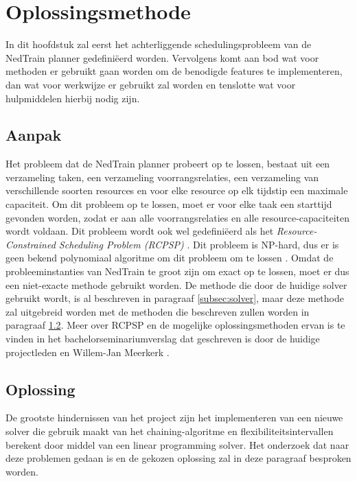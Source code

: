 \section{Oplossingsmethode}
In dit hoofdstuk zal eerst het achterliggende schedulingsprobleem van de NedTrain planner gedefini\"eerd worden. 
Vervolgens komt aan bod wat voor methoden er gebruikt gaan worden om de benodigde features te implementeren, dan wat voor werkwijze er gebruikt zal worden en tenslotte wat voor hulpmiddelen hierbij nodig zijn.

\subsection{Aanpak}
\label{subsec:probleem}
Het probleem dat de NedTrain planner probeert op te lossen, bestaat uit een verzameling taken, een verzameling voorrangsrelaties, een verzameling van verschillende soorten resources en voor elke resource op elk tijdstip een maximale capaciteit. Om dit probleem op te lossen, moet er voor elke taak een starttijd gevonden worden, zodat er aan alle voorrangsrelaties en alle resource-capaciteiten wordt voldaan.
Dit probleem wordt ook wel gedefini\"eerd als het \emph{Resource-Constrained Scheduling Problem (RCPSP)} \cite{seminarium2014}. Dit probleem is NP-hard, dus er is geen bekend polynomiaal algoritme om dit probleem om te lossen \cite{blazewicz1983scheduling}. Omdat de probleeminstanties van NedTrain te groot zijn om exact op te lossen, moet er dus een niet-exacte methode gebruikt worden. De methode die door de huidige solver gebruikt wordt, is al beschreven in paragraaf \ref{subsec:solver}, maar deze methode zal uitgebreid worden met de methoden die beschreven zullen worden in paragraaf \ref{subsec:oplossing}.
Meer over RCPSP en de mogelijke oplossingsmethoden ervan is te vinden in het bachelorseminariumverslag dat geschreven is door de huidige projectleden en Willem-Jan Meerkerk \cite{seminarium2014}.

\subsection{Oplossing}
\label{subsec:oplossing}
De grootste hindernissen van het project zijn het implementeren van een nieuwe solver die gebruik maakt van het chaining-algoritme en flexibiliteitsintervallen berekent door middel van een linear programming solver. Het onderzoek dat naar deze problemen gedaan is en de gekozen oplossing zal in deze paragraaf besproken worden.


